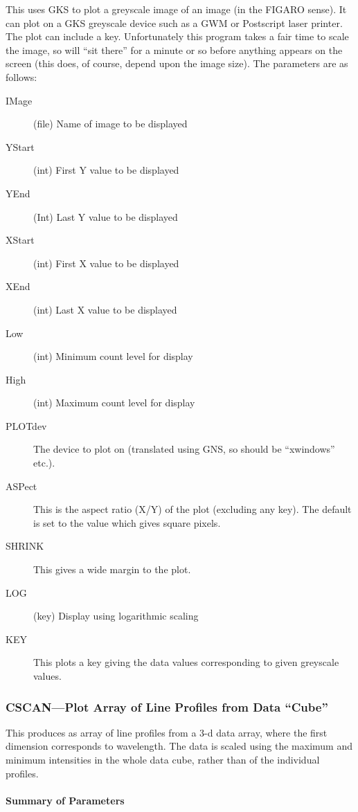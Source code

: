 \documentclass[11pt,twoside]{article}
\newcommand{\xref}[3]{#1}
\newcommand{\xlabel}[1]{}
\begin{document}
This uses GKS to plot a greyscale image of an image (in the \xref{FIGARO}{sun86}{}
sense). It can plot on a GKS greyscale device such as a GWM or
Postscript laser printer.
The plot can include a key. Unfortunately this
program takes a fair time to scale the image, so will ``sit there''
for a minute or so before anything appears on the screen (this does, of
course, depend upon the image size). The parameters are as follows:
\begin{description}
\item[IMage] (file) Name of image to be displayed
\item[YStart] (int) First Y value to be displayed
\item[YEnd] (Int) Last Y value to be displayed
\item[XStart] (int) First X value to be displayed
\item[XEnd] (int) Last X value to be displayed
\item[Low] (int) Minimum count level for display
\item[High] (int) Maximum count level for display
\item[PLOTdev] The device to plot on (translated using GNS, so
should be ``xwindows'' etc.).
\item[ASPect] This is the aspect ratio (X/Y) of the plot (excluding
any key). The default is set to the value which gives square pixels.
\item[SHRINK] This gives a wide margin to the plot.
\item[LOG] (key) Display using logarithmic scaling
\item[KEY] This plots a key giving the data values corresponding to
given greyscale values.
\end{description}

\subsubsection{\xlabel{cscanplot_array_of_line_profiles_from_data_cube}CSCAN---Plot Array of Line Profiles from Data ``Cube''}

This produces as array of line profiles from a 3-d data array, where
the first dimension corresponds to wavelength. The data is scaled using
the maximum and minimum intensities in the whole data cube, rather than
of the individual profiles.

\paragraph{Summary of Parameters}
\end{document}
